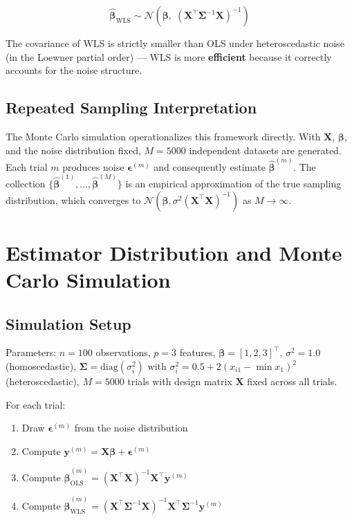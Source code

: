 \documentclass[12pt,a4paper]{article}
\begin{document}
\begin{equation}
    \boxed{\hat{\boldsymbol{\beta}}_{\mathrm{WLS}} \sim
    \mathcal{N}\!\left(\boldsymbol{\beta},\;(\mathbf{X}^\top\boldsymbol{\Sigma}^{-1}\mathbf{X})^{-1}\right)}
\end{equation}

The covariance of WLS is strictly smaller than OLS under heteroscedastic noise
(in the Loewner partial order) --- WLS is more \textbf{efficient} because it
correctly accounts for the noise structure.

\subsection{Repeated Sampling Interpretation}

The Monte Carlo simulation operationalizes this framework directly. With $\mathbf{X}$,
$\boldsymbol{\beta}$, and the noise distribution fixed, $M = 5000$ independent datasets
are generated. Each trial $m$ produces noise $\boldsymbol{\epsilon}^{(m)}$ and consequently
estimate $\hat{\boldsymbol{\beta}}^{(m)}$. The collection
$\{\hat{\boldsymbol{\beta}}^{(1)}, \ldots, \hat{\boldsymbol{\beta}}^{(M)}\}$ is an empirical
approximation of the true sampling distribution, which converges to
$\mathcal{N}(\boldsymbol{\beta}, \sigma^2(\mathbf{X}^\top\mathbf{X})^{-1})$ as $M \to \infty$.

\section{Estimator Distribution and Monte Carlo Simulation}
\label{sec:simulation}

\subsection{Simulation Setup}

Parameters: $n = 100$ observations, $p = 3$ features,
$\boldsymbol{\beta} = [1, 2, 3]^\top$, $\sigma^2 = 1.0$ (homoscedastic),
$\boldsymbol{\Sigma} = \mathrm{diag}(\sigma_i^2)$ with
$\sigma_i^2 = 0.5 + 2(x_{i1} - \min x_1)^2$ (heteroscedastic),
$M = 5000$ trials with design matrix $\mathbf{X}$ fixed across all trials.

For each trial:
\begin{enumerate}
    \item Draw $\boldsymbol{\epsilon}^{(m)}$ from the noise distribution
    \item Compute $\mathbf{y}^{(m)} = \mathbf{X}\boldsymbol{\beta} + \boldsymbol{\epsilon}^{(m)}$
    \item Compute $\hat{\boldsymbol{\beta}}_{\mathrm{OLS}}^{(m)} = (\mathbf{X}^\top\mathbf{X})^{-1}\mathbf{X}^\top\mathbf{y}^{(m)}$
    \item Compute $\hat{\boldsymbol{\beta}}_{\mathrm{WLS}}^{(m)} = (\mathbf{X}^\top\boldsymbol{\Sigma}^{-1}\mathbf{X})^{-1}\mathbf{X}^\top\boldsymbol{\Sigma}^{-1}\mathbf{y}^{(m)}$
\end{enumerate}
\end{document}
